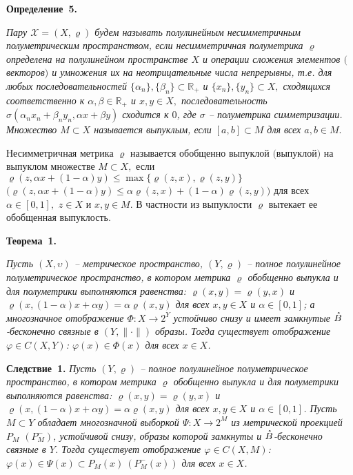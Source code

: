 \documentclass{vzmsthesis}
\begin{document}
\textbf{Определение~5.} {\it
 Пару $\mathcal{X}=(X,\varrho)$ будем называть полулинейным несимметричным полуметрическим пространством, если несимметричная полуметрика $\varrho$  определена на полулинейном пространстве $X$ и операции сложения элементов $($векторов$)$ и умножения их на неотрицательные числа непрерывны, т.е. для любых последовательностей $\{\alpha_n\},\{\beta_n\}\subset \mathbb{R}_+$ и $\{x_n\},\{y_n\}\subset X,$ сходящихся соответственно к $\alpha,\beta\in \mathbb{R}_+$ и $x,y\in X,$ последовательность  $\sigma(\alpha_n x_n+\beta_n y_n,\alpha x +\beta  y ) $ сходится к $0$, где $\sigma$ -- полуметрика симметризации.
Множество $M\subset X$ называется выпуклым, если $[a,b]\subset M$ для всех $a,b\in M.$

Несимметричная метрика $\varrho$ называется обобщенно выпуклой $($выпуклой$)$ на выпуклом множестве $M\subset X,$ если $\varrho(z,\alpha x+(1-\alpha)y)\leqslant  \max\{\varrho(z,x),\varrho(z,y)\}$ $\big(\varrho(z,\alpha x+(1-\alpha)y)\leqslant \alpha\varrho(z,x)+(1-\alpha)\varrho(z,y)\big)$ для всех $\alpha\in[0,1],$ $z\in X$ и $x,y \in M.$ В частности из выпуклости $\varrho$ вытекает ее обобщенная выпуклость.}


\textbf{Теорема~1.} {\it    Пусть  $(X,\upsilon)$ --
 метрическое пространство,
$(Y,\varrho)$  -- полное полулинейное
полуметрическое пространство, в котором метрика $\varrho$ обобщенно выпукла и для полуметрики выполняются равенства: $\varrho(x,y )=\varrho(y,x)$ и
$\varrho(x,(1-\alpha)x+\alpha y )= \alpha \varrho(x,y) $ для всех $x,y\in X$ и $\alpha\in [0,1]$;
а многозначное отображение $\Phi:X\rightarrow 2^Y$  устойчиво
снизу  и имеет замкнутые $\mathaccent'27{B} $-бесконечно связные в $ (Y,\|\cdot\|) $ образы.
 Тогда существует отображение $\varphi\in C(X,  Y)$:
$\varphi(x)\in \Phi(x)$ для всех $x\in  X$.

}





\textbf{Следствие~1.} {\it   Пусть
 $(Y,\varrho)$  -- полное полулинейное
полуметрическое пространство, в котором метрика $\varrho$ обобщенно выпукла и для полуметрики выполняются равенства: $\varrho(x,y )=\varrho(y,x)$ и
$\varrho(x,(1-\alpha)x+\alpha y )= \alpha \varrho(x,y) $ для всех $x,y\in X$ и $\alpha\in [0,1]$. Пусть $M\subset Y$ обладает
многозначной выборкой $\Psi:X\rightarrow 2^M$ из метрической проекцией $P_M$ $(P_M^-)$,
 устойчивой
снизу, образы которой замкнуты и $\mathaccent'27{B} $-бесконечно связные в $Y$.
 Тогда существует отображение $\varphi\in C(X,  M)$:
$\varphi(x)\in \Psi(x)\subset P_M(x)\ (P_M^-(x))$ для всех $x\in  X$.
}
\end{document}
